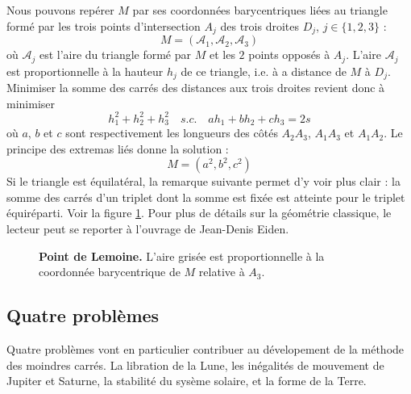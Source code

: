 \documentclass{article}
\begin{document}
Nous pouvons repérer $M$ par ses coordonnées barycentriques liées au triangle formé par les trois points d'intersection $A_{j}$ des trois droites $D_j$, $j\in\{1,2,3\}$ : 
\[M=(\mathcal A_1,\mathcal A_2,\mathcal A_3)\]
où $\mathcal A_j$ est l'aire du triangle formé par $M$ et les $2$ points opposés à $A_j$. L'aire $\mathcal A_j$ est proportionnelle à la hauteur $h_j$ de ce triangle, i.e. à a distance de $M$ à $D_j$. Minimiser la somme des carrés des distances aux trois droites revient donc à minimiser 
\[h_1^2+h_2^2+h_3^2\quad s.c.\quad ah_1+bh_2+ch_3=2s\]
où $a$, $b$ et $c$ sont respectivement les longueurs des côtés $A_2A_3$, $A_1A_3$ et $A_1A_2$. Le principe des extremas liés donne la solution :
\[M=(a^2,b^2,c^2)\]
Si le triangle est équilatéral, la remarque suivante permet d'y voir plus clair : la somme des carrés d'un triplet dont la somme est fixée est atteinte pour le triplet équiréparti. Voir la figure \ref{Lemoine}. Pour plus de détails sur la géométrie classique, le lecteur peut se reporter à l'ouvrage de Jean-Denis Eiden. ~\cite{Eiden} \\

\begin{figure}[!h]\centering
{}
\caption{\textbf{Point de Lemoine.} L'aire grisée est proportionnelle à la coordonnée barycentrique de $M$ relative à $A_3$.}
\label{Lemoine}
\end{figure}


\subsection{Quatre problèmes}
 
Quatre problèmes vont en particulier contribuer au dévelopement de la méthode des moindres carrés. La libration de la Lune, les inégalités de mouvement de Jupiter et Saturne, la stabilité du sysème solaire, et la forme de la Terre. \\
\end{document}
